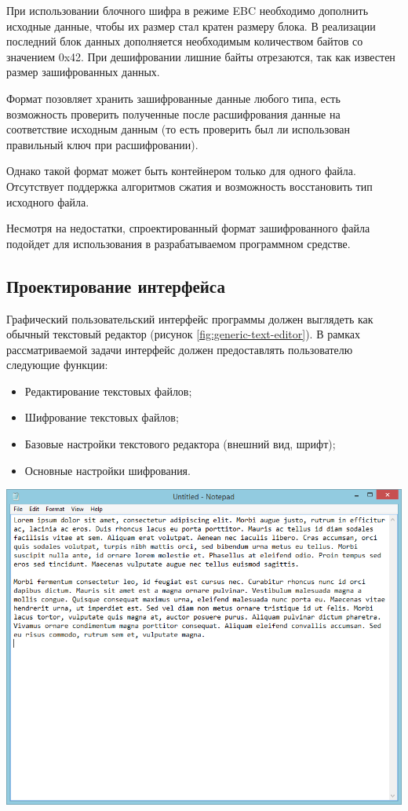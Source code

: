 При использовании блочного шифра в режиме EBC необходимо дополнить исходные
данные, чтобы их размер стал кратен размеру блока. В реализации последний
блок данных дополняется необходимым количеством байтов со значением 0x42.
При дешифровании лишние байты отрезаются, так как известен размер
зашифрованных данных.

Формат позовляет хранить зашифрованные данные любого типа,
есть возможность проверить полученные после расшифрования данные
на соответствие исходным данным (то есть проверить был ли использован
правильный ключ при расшифровании).

Однако такой формат может быть контейнером только для одного файла.
Отсутствует поддержка алгоритмов сжатия и возможность восстановить
тип исходного файла.

Несмотря на недостатки, спроектированный формат зашифрованного файла
подойдет для использования в разрабатываемом программном средстве.

\subsection{Проектирование интерфейса}

Графический пользовательский интерфейс программы должен выглядеть
как обычный текстовый редактор (рисунок \ref{fig:generic-text-editor}).
В рамках рассматриваемой задачи интерфейс должен предоставлять
пользователю следующие функции:
\begin{itemize}
    \item Редактирование текстовых файлов;
    \item Шифрование текстовых файлов;
    \item Базовые настройки текстового редактора (внешний вид, шрифт);
    \item Основные настройки шифрования.
\end{itemize}

\noindent
\begin{minipage}{\linewidth}
  \centering
  \vspace{3.5mm}
  \includegraphics[scale=0.6]{./pics/generic-text-editor.png}
  \label{fig:generic-text-editor}
  \vspace{3.5mm}
\end{minipage}
